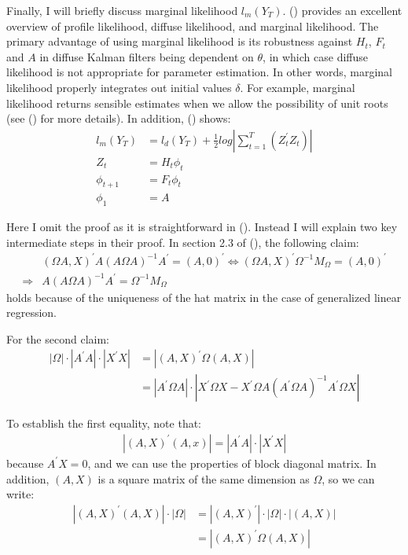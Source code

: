 \documentclass[10pt]{article}
\numberwithin{equation}{section}
\begin{document}
Finally, I will briefly discuss marginal likelihood $l_m(Y_T)$. (\cite{francke2010likelihood}) provides an excellent overview of profile likelihood, diffuse likelihood, and marginal likelihood. The primary advantage of using marginal likelihood is its robustness against $H_t$, $F_t$ and $A$ in diffuse Kalman filters being dependent on $\theta$, in which case diffuse likelihood is not appropriate for parameter estimation. In other words, marginal likelihood properly integrates out initial values $\delta$. For example, marginal likelihood returns sensible estimates when we allow the possibility of unit roots (see (\cite{francke2007marginal}) for more details). In addition, (\cite{francke2010likelihood}) shows:
\begin{align*}
    l_m(Y_T) &= l_d(Y_T) + \frac{1}{2}log\left| \sum_{t=1}^{T}(Z_t^{'}Z_t) \right| \\
    Z_t &= H_t\phi_t \\
    \phi_{t+1} &= F_t\phi_t \\
    \phi_1 &= A
\end{align*}

Here I omit the proof as it is straightforward in (\cite{francke2010likelihood}). Instead I will explain two key intermediate steps in their proof. In section 2.3 of (\cite{francke2010likelihood}), the following claim:
\begin{align*}
    &(\Omega A,X)^{'}A(A\Omega A)^{-1}A^{'}=(A,0)^{'} \Leftrightarrow (\Omega A,X)^{'}\Omega^{-1}M_{\Omega} = (A,0)^{'} \\
    \Rightarrow&A(A\Omega A)^{-1}A^{'}=\Omega^{-1}M_{\Omega}
\end{align*}
holds because of the uniqueness of the hat matrix in the case of generalized linear regression. 

For the second claim:
\begin{align*}
    |\Omega|\cdot|A^{'}A|\cdot|X^{'}X| &= |(A,X)^{'}\Omega(A,X)| \\
    &=|A^{'}\Omega A|\cdot|X^{'}\Omega X - X^{'}\Omega A(A^{'}\Omega A)^{-1}A^{'}\Omega X|
\end{align*}

To establish the first equality, note that:
\begin{align*}
    |(A,X)^{'}(A,x)| = |A^{'}A|\cdot|X^{'}X|
\end{align*}
because $A^{'}X=0$, and we can use the properties of block diagonal matrix. In addition, $(A,X)$ is a square matrix of the same dimension as $\Omega$, so we can write:
\begin{align*}
    |(A,X)^{'}(A,X)|\cdot|\Omega| &= |(A,X)^{'}|\cdot|\Omega|\cdot|(A,X)| \\
    &=|(A,X)^{'}\Omega(A,X)|
\end{align*}
\end{document}
